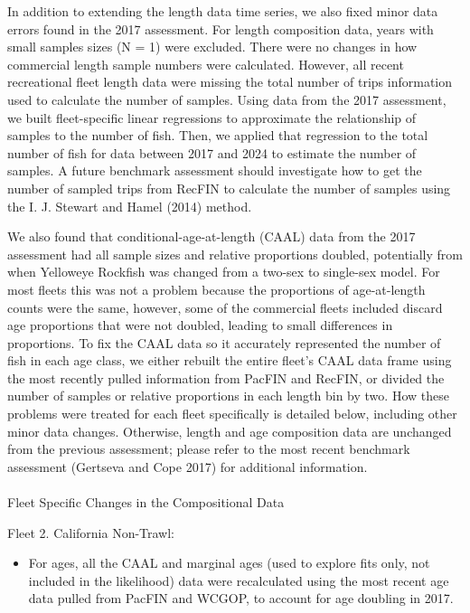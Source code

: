 \documentclass[
]{scrartcl}
\makeatletter
\let\oldparagraph\paragraph
\renewcommand{\paragraph}{
    \@ifstar
      \xxxParagraphStar
      \xxxParagraphNoStar
  }
\newcommand{\xxxParagraphStar}[1]{\oldparagraph*{#1}\mbox{}}
\newcommand{\xxxParagraphNoStar}[1]{\oldparagraph{#1}\mbox{}}
\providecommand{\tightlist}{%
  \setlength{\itemsep}{0pt}\setlength{\parskip}{0pt}}\usepackage{longtable,booktabs,array}
\makeatother
\begin{document}
In addition to extending the length data time series, we also fixed
minor data errors found in the 2017 assessment. For length composition
data, years with small samples sizes (N = 1) were excluded. There were
no changes in how commercial length sample numbers were calculated.
However, all recent recreational fleet length data were missing the
total number of trips information used to calculate the number of
samples. Using data from the 2017 assessment, we built fleet-specific
linear regressions to approximate the relationship of samples to the
number of fish. Then, we applied that regression to the total number of
fish for data between 2017 and 2024 to estimate the number of samples. A
future benchmark assessment should investigate how to get the number of
sampled trips from RecFIN to calculate the number of samples using the
I. J. Stewart and Hamel (2014) method.

We also found that conditional-age-at-length (CAAL) data from the 2017
assessment had all sample sizes and relative proportions doubled,
potentially from when Yelloweye Rockfish was changed from a two-sex to
single-sex model. For most fleets this was not a problem because the
proportions of age-at-length counts were the same, however, some of the
commercial fleets included discard age proportions that were not
doubled, leading to small differences in proportions. To fix the CAAL
data so it accurately represented the number of fish in each age class,
we either rebuilt the entire fleet's CAAL data frame using the most
recently pulled information from PacFIN and RecFIN, or divided the
number of samples or relative proportions in each length bin by two. How
these problems were treated for each fleet specifically is detailed
below, including other minor data changes. Otherwise, length and age
composition data are unchanged from the previous assessment; please
refer to the most recent benchmark assessment (Gertseva and Cope 2017)
for additional information.

\paragraph{Fleet Specific Changes in the Compositional
Data}\label{fleet-specific-changes-in-the-compositional-data}

Fleet 2. California Non-Trawl:

\begin{itemize}
\tightlist
\item
  For ages, all the CAAL and marginal ages (used to explore fits only,
  not included in the likelihood) data were recalculated using the most
  recent age data pulled from PacFIN and WCGOP, to account for age
  doubling in 2017.
\end{itemize}
\end{document}
